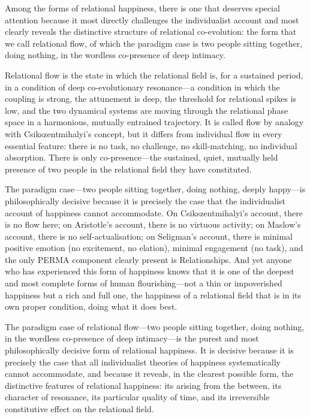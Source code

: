 \noindent
Among the forms of relational happiness, there is one that deserves special attention because it most directly challenges the individualist account and most clearly reveals the distinctive structure of relational co-evolution: the form that we call relational flow, of which the paradigm case is two people sitting together, doing nothing, in the wordless co-presence of deep intimacy.

Relational flow is the state in which the relational field is, for a sustained period, in a condition of deep co-evolutionary resonance---a condition in which the coupling is strong, the attunement is deep, the threshold for relational spikes is low, and the two dynamical systems are moving through the relational phase space in a harmonious, mutually entrained trajectory. It is called flow by analogy with Csikszentmihalyi's concept, but it differs from individual flow in every essential feature: there is no task, no challenge, no skill-matching, no individual absorption. There is only co-presence---the sustained, quiet, mutually held presence of two people in the relational field they have constituted.

The paradigm case---two people sitting together, doing nothing, deeply happy---is philosophically decisive because it is precisely the case that the individualist account of happiness cannot accommodate. On Csikszentmihalyi's account, there is no flow here; on Aristotle's account, there is no virtuous activity; on Maslow's account, there is no self-actualisation; on Seligman's account, there is minimal positive emotion (no excitement, no elation), minimal engagement (no task), and the only PERMA component clearly present is Relationships. And yet anyone who has experienced this form of happiness knows that it is one of the deepest and most complete forms of human flourishing---not a thin or impoverished happiness but a rich and full one, the happiness of a relational field that is in its own proper condition, doing what it does best.

\begin{claim}
The paradigm case of relational flow---two people sitting together, doing nothing, in the wordless co-presence of deep intimacy---is the purest and most philosophically decisive form of relational happiness. It is decisive because it is precisely the case that all individualist theories of happiness systematically cannot accommodate, and because it reveals, in the clearest possible form, the distinctive features of relational happiness: its arising from the between, its character of resonance, its particular quality of time, and its irreversible constitutive effect on the relational field.
\end{claim}

